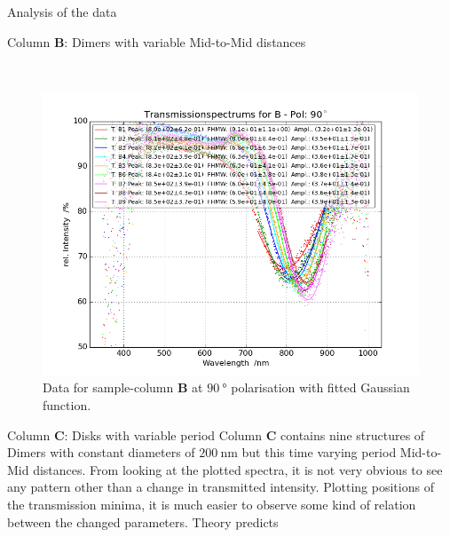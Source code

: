 \documentclass[pdftex, a4paper,11pt, twoside, UKenglish]{report}
\begin{document}
\begin{chapter}{Analysis of the data}
\begin{section}{Column \textbf{B}: Dimers with variable Mid-to-Mid
        distances}
\begin{figure}[ht!]
\begin{minipage}{.95\textwidth}
          \label{fig:TransspecFIT_BPol0}
        \end{minipage}\\
        \begin{minipage}{.95\textwidth}
          \centering
          \includegraphics[width=\textwidth]
              {Figures/TransspecFIT_BPol90.png}
          \caption{Data for sample-column \textbf{B} at $\SI{90}{\degree}$
              polarisation with fitted Gaussian function.}
          \label{fig:TransspecFIT_BPol90}
        \end{minipage}
      \end{figure}
      
    \end{section}
    
    
    
    \newpage
    \begin{section}{Column \textbf{C}: Disks with variable period}
      \label{chp:DataC}
      Column \textbf{C} contains nine structures of Dimers with constant
      diameters of $\SI{200}{\nano\meter}$ but this time varying period
      Mid-to-Mid distances.
      From looking at the plotted spectra, it is not very obvious to see any
      pattern other than a change in transmitted intensity.
      Plotting positions of the transmission minima, it is much easier to
      observe some kind of relation between the changed parameters.\newline
      Theory predicts 
      

\end{section}
\end{chapter}
\end{document}
